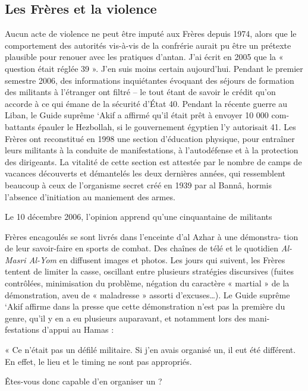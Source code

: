 \hypertarget{les-fruxe8res-et-la-violence}{%
\subsection{Les Frères et la
violence}\label{les-fruxe8res-et-la-violence}}

 
Aucun acte de violence ne peut être imputé aux Frères depuis 1974, alors
que le comportement des autorités vis-à-vis de la confrérie aurait pu
être un prétexte plausible pour renouer avec les pratiques d'antan. J'ai
écrit en 2005 que la « question était réglée 39 ». J'en suis moins
certain aujourd'hui. Pendant le premier semestre 2006, des informations
inquiétantes évoquant des séjours de formation des militants à
l'étranger ont filtré -- le tout étant de savoir le crédit qu'on accorde
à ce qui émane de la sécurité d'État 40. Pendant la récente guerre au
Liban, le Guide suprême `Akif a affirmé qu'il était prêt à envoyer 10
000 com- battants épauler le Hezbollah, si le gouvernement égyptien l'y
autorisait 41. Les Frères ont reconstitué en 1998 une section
d'éducation physique, pour entraîner leurs militants à la conduite de
manifestations, à l'autodéfense et à la protection des dirigeants. La
vitalité de cette section est attestée par le nombre de camps de
vacances découverts et démantelés les deux dernières années, qui
ressemblent beaucoup à ceux de l'organisme secret créé en 1939 par al
Bannâ, hormis l'absence d'initiation au maniement des armes.

Le 10 décembre 2006, l'opinion apprend qu'une cinquantaine de militants

Frères encagoulés se sont livrés dans l'enceinte d'al Azhar à une
démonstra- tion de leur savoir-faire en sports de combat. Des chaînes de
télé et le quotidien \emph{Al-Masri Al-Yom} en diffusent images et
photos. Les jours qui suivent, les Frères tentent de limiter la casse,
oscillant entre plusieurs stratégies discursives (fuites contrôlées,
minimisation du problème, négation du caractère « martial » de la
démonstration, aveu de « maladresse » assorti d'excuses\ldots). Le Guide
suprême `Akif affirme dans la presse que cette démonstration n'est pas
la première du genre, qu'il y en a eu plusieurs auparavant, et notamment
lors des mani- festations d'appui au Hamas :

« Ce n'était pas un défilé militaire. Si j'en avais organisé un, il eut
été différent. En effet, le lieu et le timing ne sont pas appropriés.

Êtes-vous donc capable d'en organiser un ?

